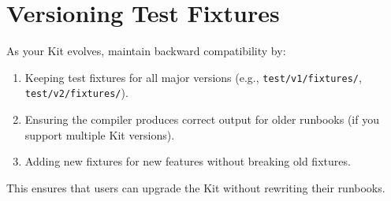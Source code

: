 \section{Versioning Test Fixtures}
\label{sec:versioning-fixtures}

As your Kit evolves, maintain backward compatibility by:

\begin{enumerate}
  \item Keeping test fixtures for all major versions (e.g.,
    \texttt{test/v1/fixtures/}, \texttt{test/v2/fixtures/}).
  \item Ensuring the compiler produces correct output for older runbooks (if
    you support multiple Kit versions).
  \item Adding new fixtures for new features without breaking old fixtures.
\end{enumerate}

This ensures that users can upgrade the Kit without rewriting their runbooks.
